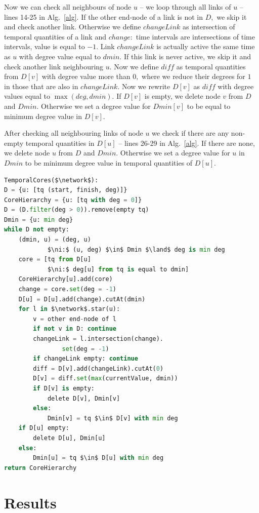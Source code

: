 \documentclass[a4paper,twoside,10pt]{article}
\newcommand{\network}{\mathcal{N}}
\begin{document}
Now we can check all neighbours of node $u$ -- we loop through all links of $u$ -- lines 14-25 in Alg.~\ref{alg}. If the other end-node of a link is not in $D,$ we skip it and check another link. Otherwise we define $changeLink$ as intersection of temporal quantities of a link and $change:$ time intervals are intersections of time intervals, value is equal to $-1.$ Link $changeLink$ is actually active the same time as $u$ with degree value equal to $dmin.$ If this link is never active, we skip it and check another link neighbouring $u.$ Now we define $diff$ as temporal quantities from $D[v]$ with degree value more than $0,$ where we reduce their degrees for $1$ in those that are also in $changeLink.$ Now we rewrite $D[v]$ as $diff$ with degree values equal to $\max(deg, dmin).$ If $D[v]$ is empty, we delete node $v$ from $D$ and $Dmin.$ Otherwise we set a degree value for $Dmin[v]$ to be equal to minimum degree value in $D[v].$

After checking all neighbouring links of node $u$ we check if there are any non-empty temporal quantities in $D[u]$ -- lines 26-29 in Alg.~\ref{alg}. If there are none, we delete node $u$ from $D$ and $Dmin.$ Otherwise we set a degree value for $u$ in $Dmin$ to be minimum degree value in temporal quantities of $D[u].$

\begin{lstlisting}[mathescape, language=Python, caption={Simple algorithm for cores in temporal networks.}, label={alg}]		
TemporalCores($\network$):
D = {u: [tq (start, finish, deg)]}
CoreHierarchy = {u: [tq with deg = 0]}
D = (D.filter(deg > 0)).remove(empty tq)
Dmin = {u: min deg}
while D not empty:
	(dmin, u) = (deg, u) 
			$\ni:$ (u, deg) $\in$ Dmin $\land$ deg is min deg
	core = [tq from D[u] 
			$\ni:$ deg[u] from tq is equal to dmin]
	CoreHierarchy[u].add(core)
	change = core.set(deg = -1)
	D[u] = D[u].add(change).cutAt(dmin)
	for l in $\network$.star(u):
		v = other end-node of l
		if not v in D: continue
		changeLink = l.intersection(change).
				set(deg = -1)
		if changeLink empty: continue
		diff = D[v].add(changeLink).cutAt(0)
		D[v] = diff.set(max(currentValue, dmin))
		if D[v] is empty:
			delete D[v], Dmin[v]
		else:
			Dmin[v] = tq $\in$ D[v] with min deg
	if D[u] empty:
		delete D[u], Dmin[u]
	else:
		Dmin[u] = tq $\in$ D[u] with min deg
return CoreHierarchy
\end{lstlisting}


%
%
\section{Results}\label{rez}
\end{document}
